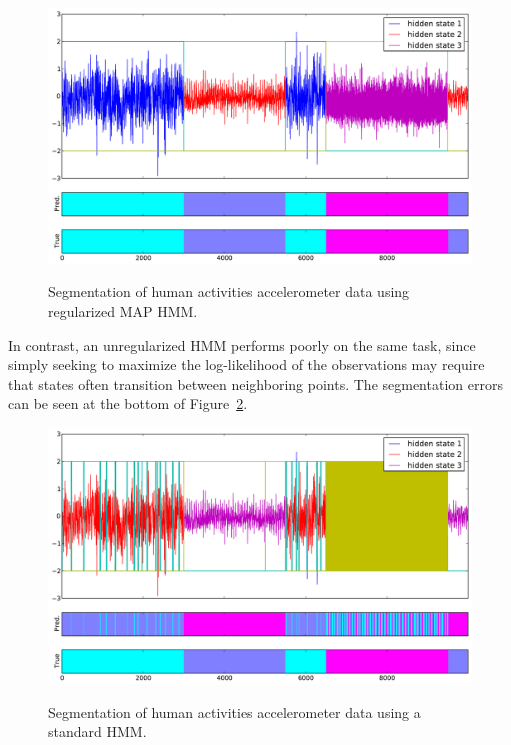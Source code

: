\documentclass[12pt]{article}
\begin{document}
\begin{figure}[htbp]
  \caption{Segmentation of human activities accelerometer data using regularized MAP HMM.}
  \centering
    \includegraphics[width=0.8\linewidth]{images/MAP_PARAM_FREE_results_hard_activity_long_1,97_3_states.pdf}
    \label{fig:real-results-MAP}
\end{figure}

In contrast, an unregularized HMM performs poorly on the same task, since simply seeking to maximize the log-likelihood of the observations may require that states often transition between neighboring points. The segmentation errors can be seen at the bottom of Figure~\ref{fig:real-results-HMM}.

\begin{figure}[htbp]
  \caption{Segmentation of human activities accelerometer data using a standard HMM.}
  \centering
    \includegraphics[width=0.8\linewidth]{images/std_hmm_results_hard_activity_3_states.pdf}
    \label{fig:real-results-HMM}
\end{figure}
\end{document}
